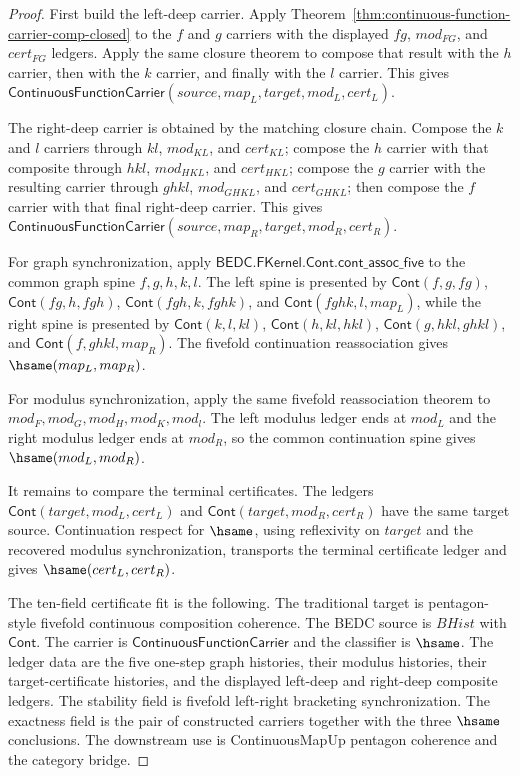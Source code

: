 \begin{proof}
First build the left-deep carrier. Apply
Theorem~\ref{thm:continuous-function-carrier-comp-closed} to the $f$ and $g$
carriers with the displayed $fg$, $mod_{FG}$, and $cert_{FG}$ ledgers. Apply
the same closure theorem to compose that result with the $h$ carrier, then
with the $k$ carrier, and finally with the $l$ carrier. This gives
$\mathsf{ContinuousFunctionCarrier}(source,map_L,target,mod_L,cert_L)$.

The right-deep carrier is obtained by the matching closure chain. Compose the
$k$ and $l$ carriers through $kl$, $mod_{KL}$, and $cert_{KL}$; compose the
$h$ carrier with that composite through $hkl$, $mod_{HKL}$, and $cert_{HKL}$;
compose the $g$ carrier with the resulting carrier through $ghkl$,
$mod_{GHKL}$, and $cert_{GHKL}$; then compose the $f$ carrier with that final
right-deep carrier. This gives
$\mathsf{ContinuousFunctionCarrier}(source,map_R,target,mod_R,cert_R)$.

For graph synchronization, apply
$\mathsf{BEDC.FKernel.Cont.cont\_assoc\_five}$ to the common graph spine
$f,g,h,k,l$. The left spine is presented by
$\mathsf{Cont}(f,g,fg)$, $\mathsf{Cont}(fg,h,fgh)$,
$\mathsf{Cont}(fgh,k,fghk)$, and $\mathsf{Cont}(fghk,l,map_L)$, while the
right spine is presented by $\mathsf{Cont}(k,l,kl)$,
$\mathsf{Cont}(h,kl,hkl)$, $\mathsf{Cont}(g,hkl,ghkl)$, and
$\mathsf{Cont}(f,ghkl,map_R)$. The fivefold continuation reassociation gives
$\hsame(map_L,map_R)$.

For modulus synchronization, apply the same fivefold reassociation theorem to
$mod_F,mod_G,mod_H,mod_K,mod_l$. The left modulus ledger ends at $mod_L$ and
the right modulus ledger ends at $mod_R$, so the common continuation spine
gives $\hsame(mod_L,mod_R)$.

It remains to compare the terminal certificates. The ledgers
$\mathsf{Cont}(target,mod_L,cert_L)$ and
$\mathsf{Cont}(target,mod_R,cert_R)$ have the same target source.
Continuation respect for $\hsame$, using reflexivity on $target$ and the
recovered modulus synchronization, transports the terminal certificate ledger
and gives $\hsame(cert_L,cert_R)$.

The ten-field certificate fit is the following. The traditional target is
pentagon-style fivefold continuous composition coherence. The BEDC source is
$BHist$ with $\mathsf{Cont}$. The carrier is
$\mathsf{ContinuousFunctionCarrier}$ and the classifier is $\hsame$. The
ledger data are the five one-step graph histories, their modulus histories,
their target-certificate histories, and the displayed left-deep and right-deep
composite ledgers. The stability field is fivefold left-right bracketing
synchronization. The exactness field is the pair of constructed carriers
together with the three $\hsame$ conclusions. The downstream use is
ContinuousMapUp pentagon coherence and the category bridge.
\end{proof}
